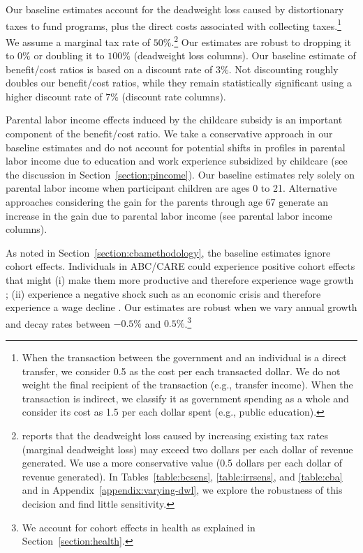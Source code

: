 Our baseline estimates account for the deadweight loss caused by distortionary taxes to fund programs, plus the direct costs associated with collecting taxes.\footnote{When the transaction between the government and an individual is a direct transfer, we consider 0.5 as the cost per each transacted dollar. We do not weight the final recipient of the transaction (e.g., transfer income). When the transaction is indirect, we classify it as government spending as a whole and consider its cost as 1.5 per each dollar spent (e.g., public education).} We assume a marginal tax rate of $50\%$.\footnote{\citet{Feldstein_1999_REStat} reports that the deadweight loss caused by increasing existing tax rates (marginal deadweight loss) may exceed two dollars per each dollar of revenue generated. We use a more conservative value (0.5 dollars per each dollar of revenue generated). In Tables~\ref{table:bcsens}, \ref{table:irrsens}, and \ref{table:cba} and in  Appendix~\ref{appendix:varying-dwl}, we explore the robustness of this decision and find little sensitivity.} Our estimates are robust to dropping it to $0\%$ or doubling it to $100\%$ (deadweight loss columns). Our baseline estimate of benefit/cost ratios is based on a discount rate of $3\%$. Not discounting roughly doubles our benefit/cost ratios, while they remain statistically significant using a higher discount rate of $7\%$ (discount rate columns).

Parental labor income effects induced by the childcare subsidy is an important component of the benefit/cost ratio. We take a conservative approach in our baseline estimates and do not account for potential shifts in profiles in parental labor income due to education and work experience subsidized by childcare (see the discussion in Section~\ref{section:pincome}). Our baseline estimates rely solely on parental labor income when participant children are ages 0 to 21. Alternative approaches considering the gain for the parents through age 67 generate an increase in the gain due to parental labor income (see parental labor income columns).

As noted in Section~\ref{section:cbamethodology}, the baseline estimates ignore cohort effects. Individuals in ABC/CARE could experience positive cohort effects that might (i) make them more productive and therefore experience wage growth \citep{Lagakos_Moll_etal_2016_LifeCycle_NBER}; (ii) experience a negative shock such as an economic crisis and therefore experience a wage decline \citep{Jarosch_2016_JobSecurity_Econometrica}. Our estimates are robust when we vary annual growth and decay rates between $-0.5\%$ and $0.5\%$.\footnote{We account for cohort effects in health as explained in Section~\ref{section:health}.}

